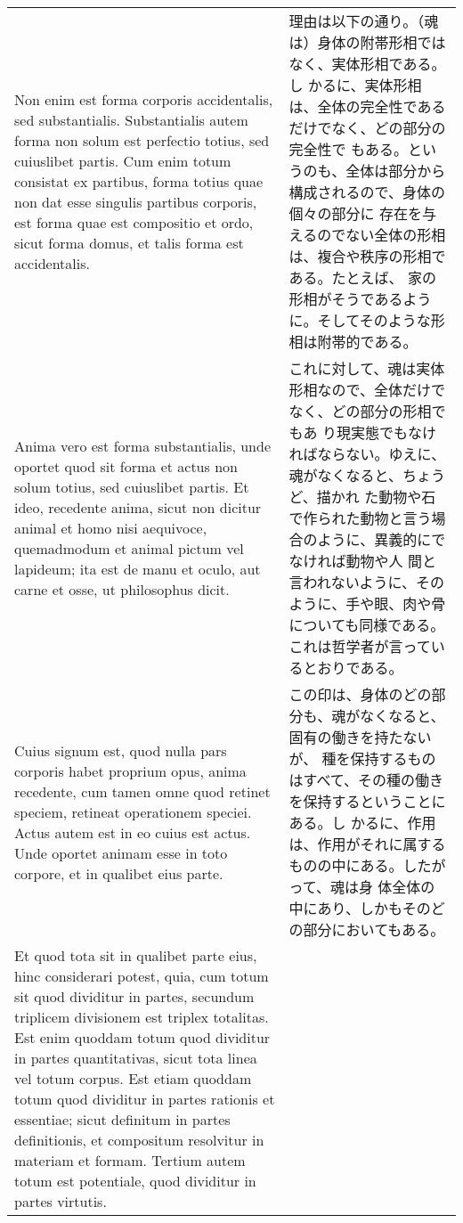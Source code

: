 \documentclass[paper=a4paper,fontsize=10pt,jafontsize=9pt,titlepage]{jlreq}
\begin{document}
\begin{longtable}{p{21em}p{21em}}
 
\\


 Non enim est forma corporis accidentalis, sed substantialis.
 Substantialis autem forma non solum est perfectio totius, sed
 cuiuslibet partis. Cum enim totum consistat ex partibus, forma totius
 quae non dat esse singulis partibus corporis, est forma quae est
 compositio et ordo, sicut forma domus, et talis forma est
 accidentalis.

&

 理由は以下の通り。（魂は）身体の附帯形相ではなく、実体形相である。し
 かるに、実体形相は、全体の完全性であるだけでなく、どの部分の完全性で
 もある。というのも、全体は部分から構成されるので、身体の個々の部分に
 存在を与えるのでない全体の形相は、複合や秩序の形相である。たとえば、
 家の形相がそうであるように。そしてそのような形相は附帯的である。
 
\\


 Anima vero est forma substantialis,
 unde oportet quod sit forma et actus non solum totius, sed cuiuslibet
 partis. Et ideo, recedente anima, sicut non dicitur animal et homo
 nisi aequivoce, quemadmodum et animal pictum vel lapideum; ita est de
 manu et oculo, aut carne et osse, ut philosophus dicit.

&

これに対して、魂は実体形相なので、全体だけでなく、どの部分の形相でもあ
り現実態でもなければならない。ゆえに、魂がなくなると、ちょうど、描かれ
た動物や石で作られた動物と言う場合のように、異義的にでなければ動物や人
間と言われないように、そのように、手や眼、肉や骨についても同様である。
これは哲学者が言っているとおりである。
 
\\


 Cuius signum est, quod nulla pars corporis habet proprium opus, anima
 recedente, cum tamen omne quod retinet speciem, retineat operationem
 speciei. Actus autem est in eo cuius est actus. Unde oportet animam
 esse in toto corpore, et in qualibet eius parte.

&

 この印は、身体のどの部分も、魂がなくなると、固有の働きを持たないが、
 種を保持するものはすべて、その種の働きを保持するということにある。し
 かるに、作用は、作用がそれに属するものの中にある。したがって、魂は身
 体全体の中にあり、しかもそのどの部分においてもある。
 
\\

 Et quod tota sit in qualibet parte eius, hinc considerari potest,
 quia, cum totum sit quod dividitur in partes, secundum triplicem
 divisionem est triplex totalitas. Est enim quoddam totum quod
 dividitur in partes quantitativas, sicut tota linea vel totum
 corpus. Est etiam quoddam totum quod dividitur in partes rationis et
 essentiae; sicut definitum in partes definitionis, et compositum
 resolvitur in materiam et formam. Tertium autem totum est potentiale,
 quod dividitur in partes virtutis.


\end{longtable}
\end{document}
